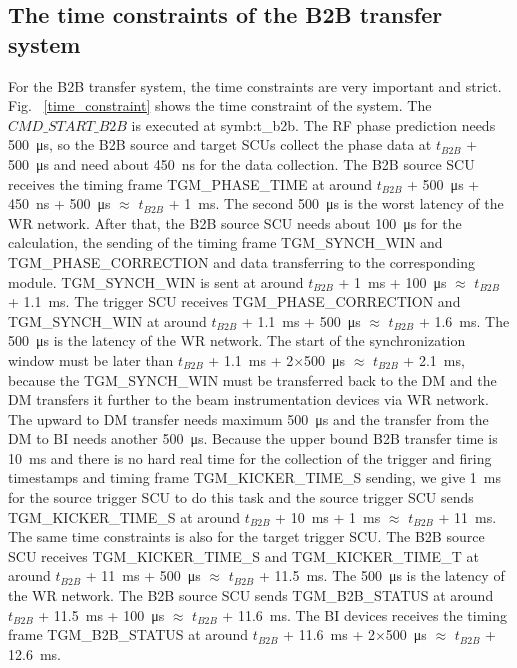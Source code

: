 \subsection{The time constraints of the B2B transfer system}
For the B2B transfer system, the time constraints are very important and strict. Fig. ~\ref{time_constraint} shows the time constraint of the system. The $CMD\_START\_B2B$ is executed at \gls{symb:t_b2b}. The RF phase prediction needs \SI{500}{\us}, so the B2B source and target SCUs collect the phase data at $t_{B2B}$ + \SI{500}{\us} and need about \SI{450}{\ns} for the data collection. The B2B source SCU receives the timing frame TGM\_PHASE\_TIME at around $t_{B2B}$ + \SI{500}{\us} + \SI{450}{\ns} + \SI{500}{\us} $\approx$ $t_{B2B}$ + \SI{1}{\ms}. The second \SI{500}{\us} is the worst latency of the WR network. After that, the B2B source SCU needs about \SI{100}{\us} for the calculation, the sending of the timing frame TGM\_SYNCH\_WIN and TGM\_PHASE\_CORRECTION and data transferring to the corresponding module. TGM\_SYNCH\_WIN is sent at around $t_{B2B}$ + \SI{1}{\ms} + \SI{100}{\us} $\approx$ $t_{B2B}$ + \SI{1.1}{\ms}. The trigger SCU receives TGM\_PHASE\_CORRECTION and TGM\_SYNCH\_WIN at around $t_{B2B}$ + \SI{1.1}{\ms} + \SI{500}{\us} $\approx$ $t_{B2B}$ + \SI{1.6}{\ms}. The \SI{500}{\us} is the latency of the WR network. The start of the synchronization window must be later than $t_{B2B}$ + \SI{1.1}{\ms} + 2$\times$\SI{500}{\us} $\approx$ $t_{B2B}$ + \SI{2.1}{\ms}, because the TGM\_SYNCH\_WIN must be transferred back to the DM and the DM transfers it further to the beam instrumentation devices via WR network. The upward to DM transfer needs maximum \SI{500}{\us} and the transfer from the DM to BI needs another \SI{500}{\us}.  Because the upper bound B2B transfer time is \SI{10}{\ms} and there is no hard real time for the collection of the trigger and firing timestamps and timing frame TGM\_KICKER\_TIME\_S sending, we give \SI{1}{\ms} for the source trigger SCU to do this task and the source trigger SCU sends TGM\_KICKER\_TIME\_S at around $t_{B2B}$ + \SI{10}{\ms} + \SI{1}{\ms} $\approx$ $t_{B2B}$ + \SI{11}{\ms}. The same time constraints is also for the target trigger SCU. The B2B source SCU receives TGM\_KICKER\_TIME\_S and TGM\_KICKER\_TIME\_T at around $t_{B2B}$ + \SI{11}{\ms} + \SI{500}{\us} $\approx$ $t_{B2B}$ + \SI{11.5}{\ms}. The \SI{500}{\us} is the latency of the WR network. The B2B source SCU sends TGM\_B2B\_STATUS at around $t_{B2B}$ + \SI{11.5}{\ms} + \SI{100}{\us} $\approx$ $t_{B2B}$ + \SI{11.6}{\ms}. The BI devices receives the timing frame TGM\_B2B\_STATUS at around $t_{B2B}$ + \SI{11.6}{\ms} + 2$\times$\SI{500}{\us} $\approx$ $t_{B2B}$ + \SI{12.6}{\ms}.

